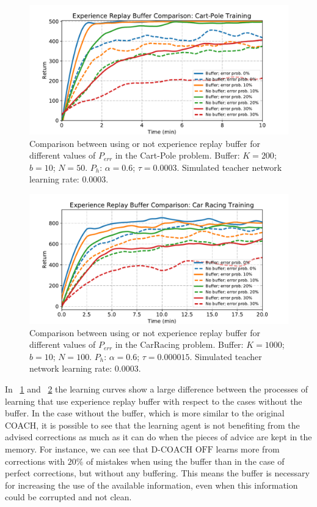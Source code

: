 \begin{figure}[t]
    \centering
    \includegraphics[width=0.9\linewidth]{imagenes/cap3/buffer_cart_pole.pdf}
    \caption{Comparison between using or not experience replay buffer for different values of $P_\mathit{err}$ in the Cart-Pole problem. Buffer: $K = 200$; $b = 10$; $N = 50$. $P_{h}$: $\alpha = 0.6$; $\tau = 0.0003$. Simulated teacher network learning rate: $0.0003$.}
    \label{fig:buffer_cart_pole}
\end{figure}

\begin{figure}[t]
    \centering
    \vspace{-0.2cm}
    \includegraphics[width=0.9\linewidth]{imagenes/cap3/bufferCarRacing.pdf}
    \vspace{-0.2cm}
    \caption{Comparison between using or not experience replay buffer for different values of $P_\mathit{err}$ in the CarRacing problem. Buffer: $K = 1000$; $b = 10$; $N = 100$. $P_{h}$: $\alpha = 0.6$; $\tau = 0.000015$. Simulated teacher network learning rate: $0.0003$.}
    \label{fig:buffer_car_racing}
\end{figure}

In \figurename~{\ref{fig:buffer_cart_pole}} and \figurename~{\ref{fig:buffer_car_racing}} the learning curves show a large difference between the processes of learning that use experience replay buffer with respect to the cases without the buffer. In the case without the buffer, which is more similar to the original COACH, it is possible to see that the learning agent is not benefiting from the advised corrections as much as it can do when the pieces of advice are kept in the memory. For instance, we can see that $\text{D-COACH OFF}$ learns more from corrections with $20 \%$ of mistakes when using the buffer than in the case of perfect corrections, but without any buffering. This means the buffer is necessary for increasing the use of the available information, even when this information could be corrupted and not clean.

